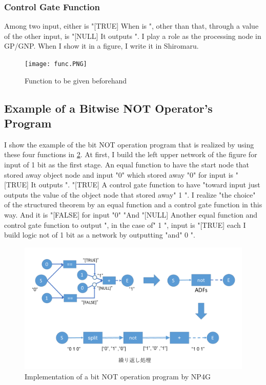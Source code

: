 \documentclass{article}
\begin{document}
\subsubsection {Control Gate Function}
Among two input, either is "[TRUE]
When is ", other than that, through a value of the other input, is "[NULL]
It outputs ".
I play a role as the processing node in GP/GNP.
When I show it in a figure, I write it in Shiromaru.

\begin{figure}[t]
\begin{center}
\texttt{[image: func.PNG]}
\end{center}
\caption {Function to be given beforehand}
\label{fig:func}
\end{figure}

\subsection {Example of a Bitwise NOT Operator's Program}
I show the example of the bit NOT operation program that is realized by using these four functions in \ref{fig:bitwise_not}.
At first, I build the left upper network of the figure for input of 1 bit as the first stage.
An equal function to have the start node that stored away object node and input "0" which stored away "0" for input is "[TRUE]
It outputs ".
"[TRUE]
A control gate function to have "toward input just outputs the value of the object node that stored away" 1 ".
I realize "the choice" of the structured theorem by an equal function and a control gate function in this way.
And it is "[FALSE] for input "0"
"And "[NULL]
Another equal function and control gate function to output ", in the case of" 1 ", input is "[TRUE] each
I build logic not of 1 bit as a network by outputting "and" 0 ".

\begin{figure}[t]
    \begin{center}
        \includegraphics[width=150mm]{bitwise_not.png}
    \end{center}
    \caption{Implementation of a bit NOT operation program by NP4G}
    \label{fig:bitwise_not}
\end{figure}
\end{document}
